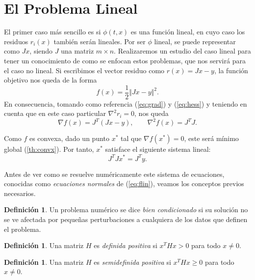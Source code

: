 \documentclass[11pt,a4paper]{book}
\theoremstyle{definition}
\newtheorem{definition}[theorem]{Definición}
\theoremstyle{remark}
\begin{document}
\section{El Problema Lineal}\label{sec:linealsqp}

El primer caso más sencillo es si $\phi (t, x)$ es una función lineal, en cuyo caso los residuos
$r_i(x)$ también serán lineales.
Por ser $\phi$ lineal, se puede representar como $Jx$, siendo $J$ una matriz
$m\times n$.
Realizaremos un estudio del caso lineal para tener un conocimiento de como se enfocan estos problemas,
que nos servirá para el caso no lineal.
Si escribimos el vector residuo como $r(x) = Jx-y$, la función objetivo nos queda de la forma
\begin{equation}
	f(x) = \frac{1}{2} \Vert Jx-y \Vert^2.
	\label{eq:flin}
\end{equation}
En consecuencia, tomando como referencia (\ref{eq:grad}) y (\ref{eq:hess}) y teniendo en cuenta que en este caso particular $\nabla^2r_i=0$, nos queda
\begin{equation}
	\nabla f(x) = J^T(Jx-y), \qquad \nabla^2 f(x) =  J^TJ.
\end{equation}

Como $f$ es convexa, dado un punto $x^*$ tal que $\nabla f(x^*) = 0$, este será mínimo global (\ref{th:convx}). Por tanto, $x^*$ satisface el siguiente sistema lineal:
\begin{equation}\label{eq:linsis}
	J^TJx^* = J^Ty.
\end{equation}

Antes de ver como se resuelve numéricamente este sistema de ecuaciones, conocidas como \textit{ecuaciones normales} de (\ref{eq:flin}), veamos los conceptos previos necesarios.

\begin{definition}
	Un problema numérico se dice \textit{bien condicionado} si su solución no se ve afectada por pequeñas perturbaciones a cualquiera de los datos que definen el problema.
\end{definition}

\begin{definition}
	Una matriz $H$ es \textit{definida positiva} si $x^THx > 0$ para todo $x \neq 0$.
\end{definition}

\begin{definition}
	Una matriz $H$ es \textit{semidefinida positiva} si $x^THx \geq 0$ para todo $x \neq 0$.
\end{definition}
\end{document}
